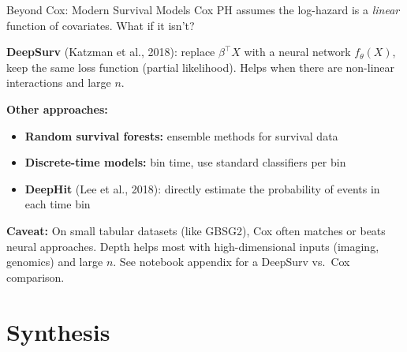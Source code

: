 \documentclass[aspectratio=169,10pt]{beamer}
\begin{document}
\begin{frame}{Beyond Cox: Modern Survival Models}
Cox PH assumes the log-hazard is a \emph{linear} function of covariates. What if it isn't?

\vspace{0.2em}
\textbf{DeepSurv} (Katzman et al., 2018): replace $\beta^\top X$ with a neural network $f_\theta(X)$, keep the same loss function (partial likelihood). Helps when there are non-linear interactions and large $n$.

\vspace{0.2em}
\textbf{Other approaches:}
\begin{itemize}
    \item \textbf{Random survival forests:} ensemble methods for survival data
    \item \textbf{Discrete-time models:} bin time, use standard classifiers per bin
    \item \textbf{DeepHit} (Lee et al., 2018): directly estimate the probability of events in each time bin
\end{itemize}

\vspace{0.2em}
\pause
{\small \textbf{Caveat:} On small tabular datasets (like GBSG2), Cox often matches or beats neural approaches. Depth helps most with high-dimensional inputs (imaging, genomics) and large $n$. See notebook appendix for a DeepSurv vs.\ Cox comparison.}
\end{frame}

\section{Synthesis}
\end{document}
